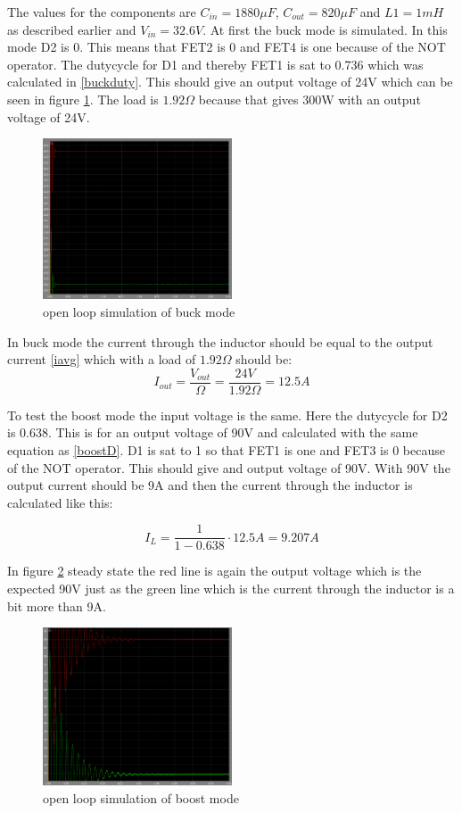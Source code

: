 The values for the components are $C_{in}=1880\mu F$, $C_{out}=820\mu F$ and $L1=1mH$ as described earlier and $V_{in}=32.6V$. At first the buck mode is simulated. In this mode D2 is 0. This means that FET2 is 0 and FET4 is one because of the NOT operator. The dutycycle for D1 and thereby FET1 is sat to 0.736 which was calculated in \ref{buckduty}. This should give an output voltage of 24V which can be seen in figure \ref{bucksimulation}. The load is $1.92\Omega$ because that gives 300W with an output voltage of 24V.     
\begin{figure}[H]
 	\begin{center}
 		\includegraphics[width=0.5\textwidth]{../Pictures/bucksimulation24}
 		\caption{open loop simulation of buck mode}
 		\label{bucksimulation}
 	\end{center}
\end{figure} 
In buck mode the current through the inductor should be equal to the output current \ref{iavg} which with a load of $1.92\Omega$ should be:
\begin{equation}
I_{out} = \frac{V_{out}}{\Omega} = \frac{24V}{1.92\Omega} = 12.5A
\end{equation}   

To test the boost mode the input voltage is the same. Here the dutycycle for D2 is 0.638. This is for an output voltage of 90V and calculated with the same equation as \ref{boostD}. D1 is sat to 1 so that FET1 is one and FET3 is 0 because of the NOT operator. This should give and output voltage of 90V. With 90V the output current should be 9A and then the current through the inductor is calculated like this:

\begin{equation}
I_{L} = \frac{1}{1-0.638}\cdot 12.5A = 9.207A
\end{equation}  

In figure \ref{boostsim} steady state the red line is again the output voltage which is the expected 90V just as the green line which is the current through the inductor is a bit more than 9A.

\begin{figure}[H]
	\begin{center}
		\includegraphics[width=0.5\textwidth]{../Pictures/boostsim}
		\caption{open loop simulation of boost mode}
		\label{boostsim}
	\end{center}
\end{figure}
